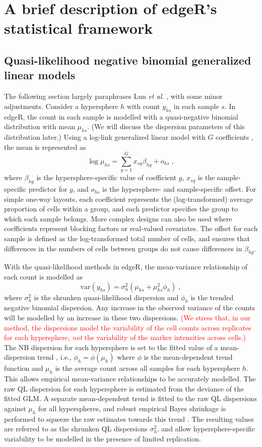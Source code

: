 \documentclass{article}
\newcommand\revised[1]{\textcolor{red}{#1}}
\begin{document}
\section{A brief description of edgeR's statistical framework}

\subsection{Quasi-likelihood negative binomial generalized linear models}
The following section largely paraphrases Lun \textit{et al.} \cite{lun2016delicious}, with some minor adjustments.
Consider a hypersphere $h$ with count $y_{hs}$ in each sample $s$.
In edgeR, the count in each sample is modelled with a quasi-negative binomial distribution with mean $\mu_{hs}$.
(We will discuss the dispersion parameters of this distribution later.)
Using a log-link generalized linear model with $G$ coefficients \cite{mccarthy2012differential}, the mean is represented as
\[
    \log \mu_{hs} = \sum_{g=1}^G x_{sg} \beta_{hg} + o_{hs} \;,
\]
where $\beta_{hg}$ is the hypersphere-specific value of coefficient $g$, $x_{sg}$ is the sample-specific predictor for $g$, and $o_{hs}$ is the hypersphere- and sample-specific offset.
For simple one-way layouts, each coefficient represents the (log-transformed) average proportion of cells within a group, and each predictor specifies the group to which each sample belongs.
More complex designs can also be used where coefficients represent blocking factors or real-valued covariates.
The offset for each sample is defined as the log-transformed total number of cells, and ensures that differences in the numbers of cells between groups do not cause differences in $\beta_{hg}$.

With the quasi-likelihood methods in edgeR, the mean-variance relationship of each count is modelled as
\[
    \mbox{var}(y_{hs}) = \sigma^2_{h} (\mu_{hs} + \mu_{hs}^2 \phi_h) \;,
\]
where $\sigma^2_h$ is the shrunken quasi-likelihood dispersion and $\phi_h$ is the trended negative binomial dispersion.
Any increase in the observed variance of the counts will be modelled by an increase in these two dispersions.
\revised{(We stress that, in our method, the dispersions model the variability of the cell counts across replicates for each hypersphere, \textit{not} the variability of the marker intensities across cells.)}
The NB dispersion for each hypersphere is set to the fitted value of a mean-dispersion trend \cite{mccarthy2012differential}, i.e., $\phi_h = \phi(\mu_h)$ where $\phi$ is the mean-dependent trend function and $\mu_h$ is the average count across all samples for each hypersphere $h$.
This allows empirical mean-variance relationships to be accurately modelled.
The raw QL dispersion for each hypersphere is estimated from the deviance of the fitted GLM.
A separate mean-dependent trend is fitted to the raw QL dispersions against $\mu_h$ for all hyperspheres, and robust empirical Bayes shrinkage is performed to squeeze the raw estimates towards this trend \cite{lund2012detecting,phipson2016robust}.
The resulting values are referred to as the shrunken QL dispersions $\sigma^2_h$, and allow hypersphere-specific variability to be modelled in the presence of limited replication.
\end{document}
